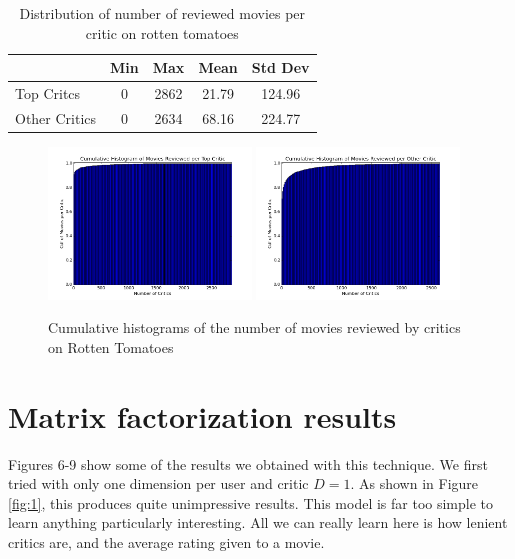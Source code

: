 \documentclass[12pt]{article}
\begin{document}
	\begin{table}[H]
	 \centering
	 \caption{Distribution of number of reviewed movies per critic on rotten tomatoes} 
	 \begin{tabular}{ l | c | c | c | c }
	 \hline
	 &  Min & Max & Mean & Std Dev  \\
	 \hline
	 Top Critcs & 0 & 2862 & 21.79 & 124.96 \\
	 Other Critics & 0 & 2634 & 68.16 & 224.77 \\
	 \hline
	 \end{tabular}
	 \end{table}

	\begin{figure}[H]
	    \centering
	    \includegraphics[width=0.48\textwidth]{plots/plot_r_crit_top.png}
	    \includegraphics[width=0.48\textwidth]{plots/plot_r_crit_oth.png}
	    \caption{Cumulative histograms of the number of movies reviewed by critics on Rotten Tomatoes}
	    \label{fig:r_crit}
	\end{figure}



\section{Matrix factorization results}

Figures 6-9 show some of the results we obtained with this technique. We first tried with only one dimension per user and critic $D=1$. As shown in Figure \ref{fig:1}, this produces quite unimpressive results. This model is far too simple to learn anything particularly interesting. All we can really learn here is how lenient critics are, and the average rating given to a movie.
\end{document}

